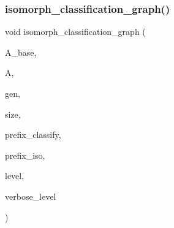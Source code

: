 \subsubsection{\texorpdfstring{isomorph\+\_\+classification\+\_\+graph()}{isomorph\_classification\_graph()}}
{\footnotesize\ttfamily void isomorph\+\_\+classification\+\_\+graph (\begin{DoxyParamCaption}\item[{\mbox{\hyperlink{classaction}{action}} $\ast$}]{A\+\_\+base,  }\item[{\mbox{\hyperlink{classaction}{action}} $\ast$}]{A,  }\item[{\mbox{\hyperlink{classgenerator}{generator}} $\ast$}]{gen,  }\item[{\mbox{\hyperlink{galois_8h_a09fddde158a3a20bd2dcadb609de11dc}{I\+NT}}}]{size,  }\item[{const \mbox{\hyperlink{galois_8h_ab6cc7b4aeb6ea31aba2b3fbfc83ff5e6}{B\+Y\+TE}} $\ast$}]{prefix\+\_\+classify,  }\item[{const \mbox{\hyperlink{galois_8h_ab6cc7b4aeb6ea31aba2b3fbfc83ff5e6}{B\+Y\+TE}} $\ast$}]{prefix\+\_\+iso,  }\item[{\mbox{\hyperlink{galois_8h_a09fddde158a3a20bd2dcadb609de11dc}{I\+NT}}}]{level,  }\item[{\mbox{\hyperlink{galois_8h_a09fddde158a3a20bd2dcadb609de11dc}{I\+NT}}}]{verbose\+\_\+level }\end{DoxyParamCaption})}

\mbox{\label{isomorph__global_8_c_a3613cea19158edd30958c4edecd97d53}} 
